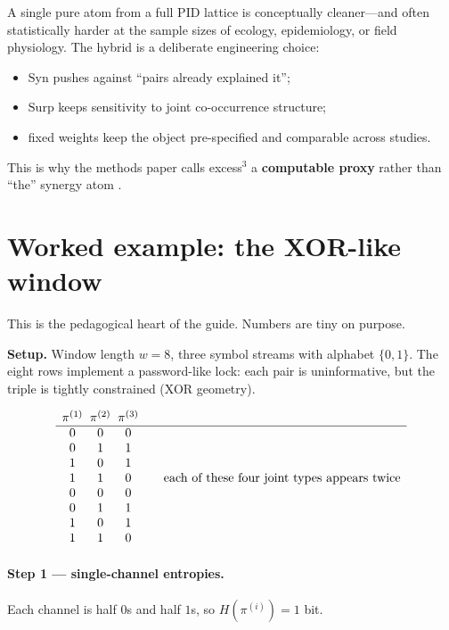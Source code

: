 \documentclass[11pt,a4paper]{article}
\begin{document}
A single pure atom from a full PID lattice is conceptually cleaner---and
often statistically harder at the sample sizes of ecology, epidemiology, or
field physiology. The hybrid is a deliberate engineering choice:
\begin{itemize}[leftmargin=*,itemsep=2pt]
  \item $\mathrm{Syn}$ pushes against ``pairs already explained it'';
  \item $\mathrm{Surp}$ keeps sensitivity to joint co-occurrence structure;
  \item fixed weights keep the object pre-specified and comparable across
  studies.
\end{itemize}

This is why the methods paper calls excess$^3$ a \textbf{computable proxy}
rather than ``the'' synergy atom \citep{Padilla2026excess3}.

\section{Worked example: the XOR-like window}
\label{sec:xor}

This is the pedagogical heart of the guide. Numbers are tiny on purpose.

\begin{workbox}
\textbf{Setup.} Window length $w=8$, three symbol streams with alphabet
$\{0,1\}$. The eight rows implement a password-like lock: each pair is
uninformative, but the triple is tightly constrained (XOR geometry).
\end{workbox}

\begin{equation*}
\begin{array}{c@{\;\;}c@{\;\;}c@{\qquad}l}
\pi^{(1)} & \pi^{(2)} & \pi^{(3)} & \\
\hline
0 & 0 & 0 & \\
0 & 1 & 1 & \\
1 & 0 & 1 & \\
1 & 1 & 0 & \text{each of these four joint types appears twice} \\
0 & 0 & 0 & \\
0 & 1 & 1 & \\
1 & 0 & 1 & \\
1 & 1 & 0 &
\end{array}
\end{equation*}

\paragraph{Step 1 --- single-channel entropies.}
Each channel is half $0$s and half $1$s, so $H(\pi^{(i)})=1$ bit.
\end{document}
